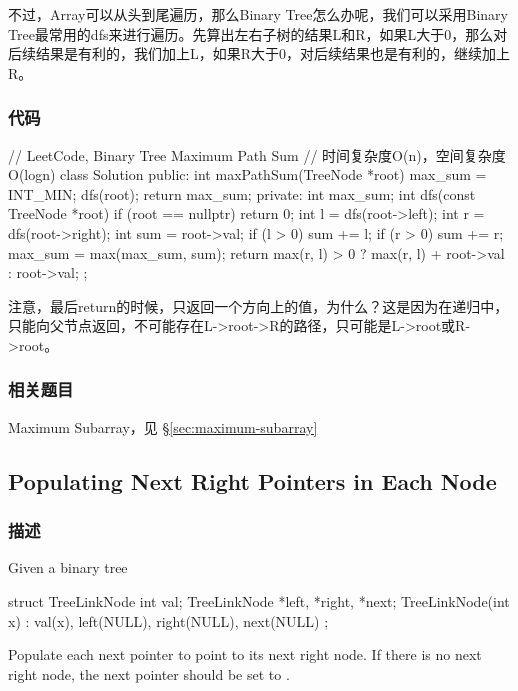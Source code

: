 不过，Array可以从头到尾遍历，那么Binary Tree怎么办呢，我们可以采用Binary Tree最常用的dfs来进行遍历。先算出左右子树的结果L和R，如果L大于0，那么对后续结果是有利的，我们加上L，如果R大于0，对后续结果也是有利的，继续加上R。

\subsubsection{代码}

\begin{Code}
// LeetCode, Binary Tree Maximum Path Sum
// 时间复杂度O(n)，空间复杂度O(logn)
class Solution {
public:
    int maxPathSum(TreeNode *root) {
        max_sum = INT_MIN;
        dfs(root);
        return max_sum;
    }
private:
    int max_sum;
    int dfs(const TreeNode *root) {
        if (root == nullptr) return 0;
        int l = dfs(root->left);
        int r = dfs(root->right);
        int sum = root->val;
        if (l > 0) sum += l;
        if (r > 0) sum += r;
        max_sum = max(max_sum, sum);
        return max(r, l) > 0 ? max(r, l) + root->val : root->val;
    }
};
\end{Code}

注意，最后return的时候，只返回一个方向上的值，为什么？这是因为在递归中，只能向父节点返回，不可能存在L->root->R的路径，只可能是L->root或R->root。


\subsubsection{相关题目}
\begindot
\item Maximum Subarray，见 \S \ref{sec:maximum-subarray}
\myenddot


\subsection{Populating Next Right Pointers in Each Node} %
\label{sec:populating-next-right-pointers-in-each-node}


\subsubsection{描述}
Given a binary tree
\begin{Code}
struct TreeLinkNode {
   int val;
   TreeLinkNode *left, *right, *next;
   TreeLinkNode(int x) : val(x), left(NULL), right(NULL), next(NULL) {}
};
\end{Code}

Populate each next pointer to point to its next right node. If there is no next right node, the next pointer should be set to .

